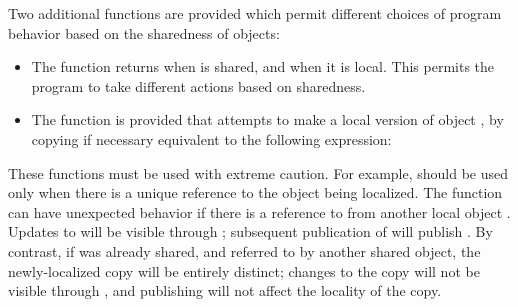 Two additional functions are provided which permit different choices of
program behavior based on the sharedness of objects:
\begin{itemize}
\item The function  returns  when
 is shared, and  when it is local.  This permits
the program to take different actions based on sharedness.
\item The function  is provided that attempts to make a local version of object , by copying if necessary
equivalent to the following expression:
\end{itemize}
These functions must be used with extreme caution.  For example,
 should be used only when there is a unique
reference to the object being localized.  The  function
can have unexpected behavior if there is a reference to  from
another local object .  Updates to  will be visible
through ; subsequent publication of  will publish
.  By contrast, if  was already shared, and referred to
by another shared object, the newly-localized copy will be entirely
distinct; changes to the copy will not be visible through , and
publishing  will not affect the locality of the copy.
